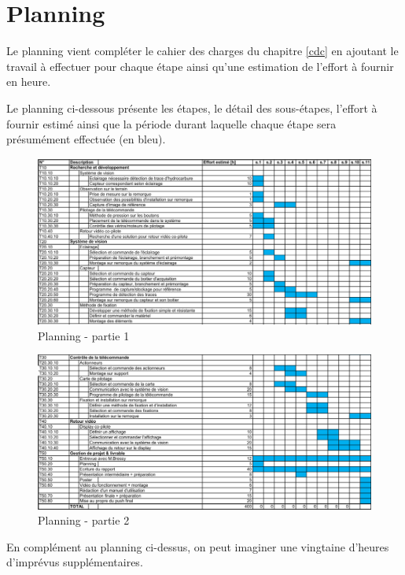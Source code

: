\section{Planning}
Le planning vient compléter le cahier des charges du chapitre \ref{cdc} en ajoutant le travail à effectuer pour chaque étape ainsi qu'une estimation
de l'effort à fournir en heure.

Le planning ci-dessous présente les étapes, le détail des sous-étapes, l'effort à fournir estimé ainsi que la période durant laquelle chaque étape sera présumément effectuée (en bleu).
\begin{figure}[H]
    \centering
    \includegraphics[width=15cm, angle=90]{assets/figures/planning1.png}
    \caption{Planning - partie 1}
\end{figure}
\newpage
\begin{figure}[H]
    \centering
    \includegraphics[width=15cm, angle=90]{assets/figures/planning2.png}
    \caption{Planning - partie 2}
\end{figure}

En complément au planning ci-dessus, on peut imaginer une vingtaine d'heures d'imprévus supplémentaires.